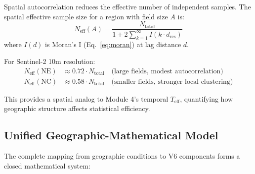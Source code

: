 Spatial autocorrelation reduces the effective number of independent samples.
The spatial effective sample size for a region with field size $A$ is:
\begin{equation}
    N_{\text{eff}}(A) = \frac{N_{\text{total}}}{1 + 2\sum_{k=1}^\infty
    I(k \cdot d_{\text{res}})}
\end{equation}
where $I(d)$ is Moran's I (Eq.~\ref{eq:moran}) at lag distance $d$.

For Sentinel-2 10m resolution:
\begin{align}
    N_{\text{eff}}(\text{NE}) &\approx 0.72 \cdot N_{\text{total}}
    \quad \text{(large fields, modest autocorrelation)} \\
    N_{\text{eff}}(\text{NC}) &\approx 0.58 \cdot N_{\text{total}}
    \quad \text{(smaller fields, stronger local clustering)}
\end{align}

This provides a spatial analog to Module 4's temporal $T_{\text{eff}}$,
quantifying how geographic structure affects statistical efficiency.

\subsection{Unified Geographic-Mathematical Model}

The complete mapping from geographic conditions to V6 components forms a
closed mathematical system:


